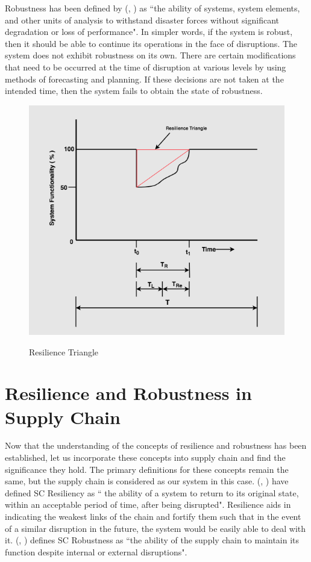 Robustness has been defined by (\citeauthor{Tierney2007}, \citeyear{Tierney2007}) as ``the ability of systems, system elements,
and other units of analysis to withstand disaster
forces without significant degradation or loss of
performance". In simpler words, if the system is robust, then it should be able to continue its operations in the face of disruptions. The system does not exhibit robustness on its own. There are certain modifications that need to be occurred at the time of disruption at various levels by using methods of forecasting and planning. If these decisions are not taken at the intended time, then the system fails to obtain the state of robustness. 

\begin{figure}
  \centering
  \includegraphics[width=6.5in]{figures/pdf/Resilience-Triangle.png}\\
  \caption{Resilience Triangle} \label{Resilience Triangle}
\end{figure}

\newpage
\section{Resilience and Robustness in Supply Chain}
Now that the understanding of the concepts of resilience and robustness has been established, let us incorporate these concepts into supply chain and find the significance they hold. The primary definitions for these concepts remain the same, but the supply chain is considered as our system in this case. (\citeauthor{Brandon-JonesE.;SquireB.;Autry2014},  \citeyear{Brandon-JonesE.;SquireB.;Autry2014})  have defined SC Resiliency as `` the ability of a system to return to its original state, within an acceptable period of time, after being disrupted". Resilience aids in indicating the weakest links of the chain and fortify them such that in the event of a similar disruption in the future, the system would be easily able to deal with it. (\citeauthor{Kitano2004}, \citeyear{Kitano2004}) defines SC Robustness as ``the ability of the supply chain to maintain its function despite internal or external disruptions".

